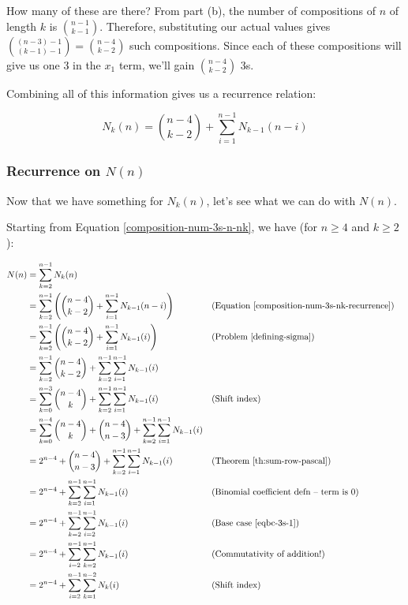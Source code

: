 How many of these are there? From part (b), the number of compositions of $n$ of length $k$ is $\binom{n-1}{k-1}$. Therefore, substituting our actual values gives $\binom{(n-3)-1}{(k-1)-1} = \binom{n-4}{k-2}$ such compositions. Since each of these compositions will give us one 3 in the $x_1$ term, we'll gain $\binom{n-4}{k-2}$ 3s.

Combining all of this information gives us a recurrence relation:

\begin{equation} 
\label{composition-num-3s-nk-recurrence}
N_k(n) = \binom{n-4}{k-2} + \sum_{i=1}^{n-1} N_{k-1}(n-i)
\end{equation}


\subsubsection{Recurrence on $N(n)$}

Now that we have something for $N_k(n)$, let's see what we can do with $N(n)$. 

Starting from Equation \ref{composition-num-3s-n-nk}, we have (for $n \geq 4$ and $k \geq 2$):

\begin{align*}
N(n) &= \sum_{k=2}^{n-1} N_k(n) \\
&= \sum_{k=2}^{n-1} \left( \binom{n-4}{k-2} + \sum_{i=1}^{n-1} N_{k-1}(n-i) \right) && \text{(Equation \ref{composition-num-3s-nk-recurrence})} \\
&= \sum_{k=2}^{n-1} \left( \binom{n-4}{k-2} + \sum_{i=1}^{n-1} N_{k-1}(i) \right) && \text{(Problem \ref{defining-sigma})} \\
&= \sum_{k=2}^{n-1} \binom{n-4}{k-2} + \sum_{k=2}^{n-1} \sum_{i=1}^{n-1} N_{k-1}(i) \\
&= \sum_{k=0}^{n-3} \binom{n-4}{k} + \sum_{k=2}^{n-1} \sum_{i=1}^{n-1} N_{k-1}(i) && \text{(Shift index)} \\
&= \sum_{k=0}^{n-4} \binom{n-4}{k} + \binom{n-4}{n-3} + \sum_{k=2}^{n-1} \sum_{i=1}^{n-1} N_{k-1}(i) \\
&= 2^{n-4} + \binom{n-4}{n-3} + \sum_{k=2}^{n-1} \sum_{i=1}^{n-1} N_{k-1}(i) && \text{(Theorem \ref{th:sum-row-pascal})} \\
&= 2^{n-4} + \sum_{k=2}^{n-1} \sum_{i=1}^{n-1} N_{k-1}(i) && \text{(Binomial coefficient defn -- term is 0)} \\
&= 2^{n-4} + \sum_{k=2}^{n-1} \sum_{i=2}^{n-1} N_{k-1}(i) && \text{(Base case \ref{eqbc-3s-1})} \\
&= 2^{n-4} + \sum_{i=2}^{n-1} \sum_{k=2}^{n-1} N_{k-1}(i) && \text{(Commutativity of addition!)} \\
&= 2^{n-4} + \sum_{i=2}^{n-1} \sum_{k=1}^{n-2} N_{k}(i) && \text{(Shift index)}
\end{align*}

